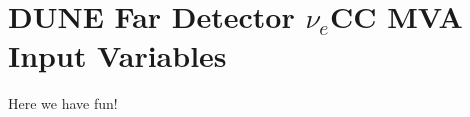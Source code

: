 
\graphicspath{{AppendixFDMVAVariables/Figs/}}

\chapter{DUNE Far Detector $\nu_e$CC MVA Input Variables}\label{appen:FDMVAVariables}

Here we have fun!
